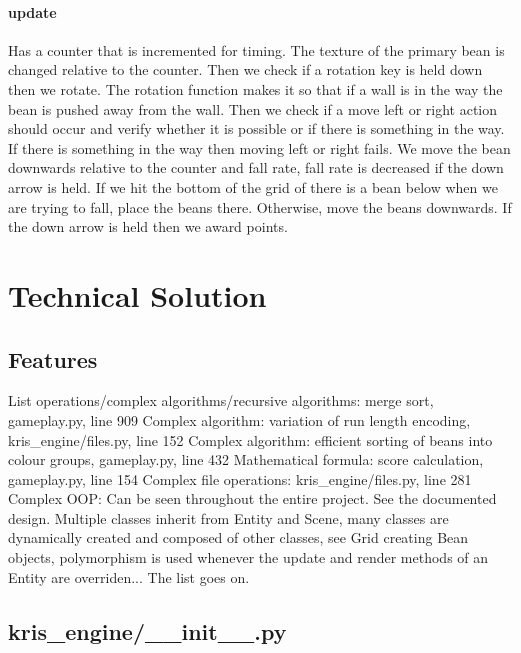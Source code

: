 \documentclass{report}
\begin{document}
\subsubsection{update}

Has a counter that is incremented for timing. The texture of the primary bean is changed relative to the counter. Then we check if a rotation key is held down then we rotate. The rotation function makes it so that if a wall is in the way the bean is pushed away from the wall. Then we check if a move left or right action should occur and verify whether it is possible or if there is something in the way. If there is something in the way then moving left or right fails. We move the bean downwards relative to the counter and fall rate, fall rate is decreased if the down arrow is held. If we hit the bottom of the grid of there is a bean below when we are trying to fall, place the beans there. Otherwise, move the beans downwards. If the down arrow is held then we award points.

\chapter{Technical Solution}

\section{Features}

List operations/complex algorithms/recursive algorithms: merge sort, gameplay.py, line 909
Complex algorithm: variation of run length encoding, kris\_engine/files.py, line 152
Complex algorithm: efficient sorting of beans into colour groups, gameplay.py, line 432
Mathematical formula: score calculation, gameplay.py, line 154
Complex file operations: kris\_engine/files.py, line 281
Complex OOP: Can be seen throughout the entire project. See the documented design. Multiple classes inherit from Entity and Scene, many classes are dynamically created and composed of other classes, see Grid creating Bean objects, polymorphism is used whenever the update and render methods of an Entity are overriden... The list goes on.


\section{kris\_engine/\_\_init\_\_.py}

\inputminted[breaklines, linenos]{python}{../game/kris_engine/__init__.py}
\end{document}
